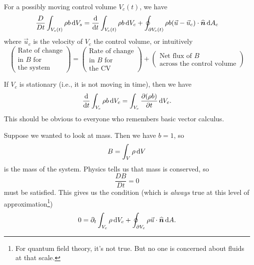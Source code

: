 \begin{theorem}
For a possibly moving control volume $V_{c}(t)$, we have
\begin{equation}\label{eq:fall:lec3:reynolds-transport-theorem}
\frac{D}{D t}\int_{V_{s}(t)}\rho b\,\mathrm{d} V_{s} =
\frac{\mathrm{d}}{\mathrm{d} t}\int_{V_{c}(t)}\rho b\,\mathrm{d} V_{c} +
\oint_{\partial V_{c}(t)}\rho b(\vec{u}-\vec{u}_{c})\cdot\widehat{\boldsymbol{n}}\,\mathrm{d} A_{c}
\end{equation}
where $\vec{u}_{c}$ is the velocity of $V_{c}$ the control volume,
or intuitively
\begin{equation}
  \begin{pmatrix}\mbox{Rate of change}\\
    \mbox{in $B$ for}\\
    \mbox{the system}
  \end{pmatrix}=
  \begin{pmatrix}\mbox{Rate of change}\\
    \mbox{in $B$ for}\\
    \mbox{the CV}
  \end{pmatrix} + 
  \begin{pmatrix}\mbox{Net flux of $B$}\\
    \mbox{across the control volume}
  \end{pmatrix}
\end{equation}
\end{theorem}

\begin{remark}
If $V_{c}$ is stationary (i.e., it is not moving in time),
then we have
\begin{equation}
\frac{\mathrm{d}}{\mathrm{d} t}\int_{V_{c}}\rho b\,\mathrm{d} V_{c}
=\int_{V_{c}}\frac{\partial(\rho b)}{\partial t}\,\mathrm{d} V_{c}.
\end{equation}
This should be obvious to everyone who remembers basic vector
calculus. 
\end{remark}

\begin{example}
Suppose we wanted to look at mass. Then we have $b=1$, so
\begin{equation}
B=\int_{V}\rho\,\mathrm{d} V
\end{equation}
is the mass of the system. Physics tells us that mass is conserved, so
\begin{equation}
\frac{D B}{D t}=0
\end{equation}
must be satisfied. This gives us the condition (which is \emph{always}
true at this level of approximation\footnote{For quantum field theory,
it's not true. But no one is concerned about fluids at that scale.})
\begin{equation}\label{eq:fall:lec3:mass-conservation}
0=\partial_{t}\int_{V_{c}}\rho\,\mathrm{d} V_{c}+\oint_{\partial V_{c}}\rho\vec{u}\cdot\widehat{\boldsymbol{n}}\,\mathrm{d} A.
\end{equation}
\end{example}

